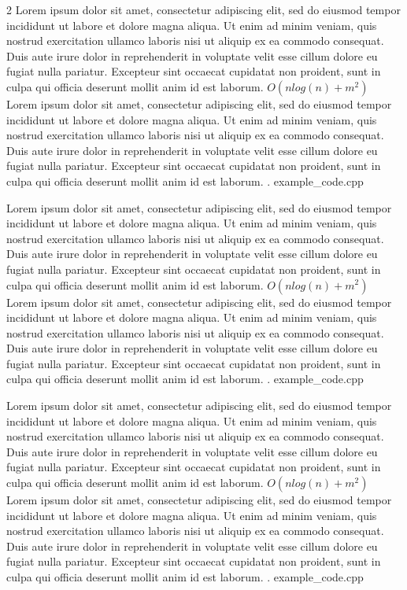 \begin{multicols*}{2}
			{Lorem ipsum dolor sit amet, consectetur adipiscing elit, sed do eiusmod tempor incididunt ut labore et dolore magna aliqua. Ut enim ad minim veniam, quis nostrud exercitation ullamco laboris nisi ut aliquip ex ea commodo consequat. Duis aute irure dolor in reprehenderit in voluptate velit esse cillum dolore eu fugiat nulla pariatur. Excepteur sint occaecat cupidatat non proident, sunt in culpa qui officia deserunt mollit anim id est laborum.}
			{$O(nlog(n) + m^{2})$}
			{Lorem ipsum dolor sit amet, consectetur adipiscing elit, sed do eiusmod tempor incididunt ut labore et dolore magna aliqua. Ut enim ad minim veniam, quis nostrud exercitation ullamco laboris nisi ut aliquip ex ea commodo consequat. Duis aute irure dolor in reprehenderit in voluptate velit esse cillum dolore eu fugiat nulla pariatur. Excepteur sint occaecat cupidatat non proident, sunt in culpa qui officia deserunt mollit anim id est laborum.}
			{.}
			{example_code.cpp}
			
			{Lorem ipsum dolor sit amet, consectetur adipiscing elit, sed do eiusmod tempor incididunt ut labore et dolore magna aliqua. Ut enim ad minim veniam, quis nostrud exercitation ullamco laboris nisi ut aliquip ex ea commodo consequat. Duis aute irure dolor in reprehenderit in voluptate velit esse cillum dolore eu fugiat nulla pariatur. Excepteur sint occaecat cupidatat non proident, sunt in culpa qui officia deserunt mollit anim id est laborum.}
			{$O(nlog(n) + m^{2})$}
			{Lorem ipsum dolor sit amet, consectetur adipiscing elit, sed do eiusmod tempor incididunt ut labore et dolore magna aliqua. Ut enim ad minim veniam, quis nostrud exercitation ullamco laboris nisi ut aliquip ex ea commodo consequat. Duis aute irure dolor in reprehenderit in voluptate velit esse cillum dolore eu fugiat nulla pariatur. Excepteur sint occaecat cupidatat non proident, sunt in culpa qui officia deserunt mollit anim id est laborum.}
			{.}
			{example_code.cpp}
			
			{Lorem ipsum dolor sit amet, consectetur adipiscing elit, sed do eiusmod tempor incididunt ut labore et dolore magna aliqua. Ut enim ad minim veniam, quis nostrud exercitation ullamco laboris nisi ut aliquip ex ea commodo consequat. Duis aute irure dolor in reprehenderit in voluptate velit esse cillum dolore eu fugiat nulla pariatur. Excepteur sint occaecat cupidatat non proident, sunt in culpa qui officia deserunt mollit anim id est laborum.}
			{$O(nlog(n) + m^{2})$}
			{Lorem ipsum dolor sit amet, consectetur adipiscing elit, sed do eiusmod tempor incididunt ut labore et dolore magna aliqua. Ut enim ad minim veniam, quis nostrud exercitation ullamco laboris nisi ut aliquip ex ea commodo consequat. Duis aute irure dolor in reprehenderit in voluptate velit esse cillum dolore eu fugiat nulla pariatur. Excepteur sint occaecat cupidatat non proident, sunt in culpa qui officia deserunt mollit anim id est laborum.}
			{.}
			{example_code.cpp}
			

\end{multicols*}
